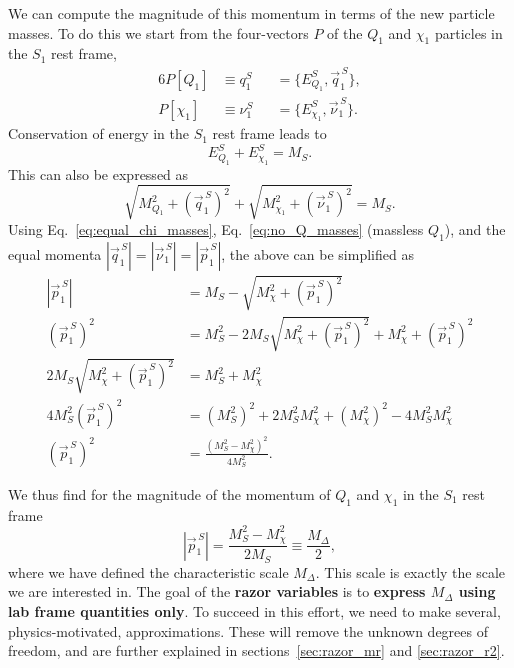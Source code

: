 We can compute the magnitude of this momentum in terms of the new particle masses. To do this we
start from the four-vectors $P$ of the $Q_1$ and $\chi_1$ particles in the $S_1$ rest frame, 
\begin{alignat}{6}
  P[Q_1]    &\equiv q_1^S   &&= \{ E^S_{Q_1}, \vec{q}^{\,S}_1\} , \\
  P[\chi_1] &\equiv \nu_1^S &&= \{ E^S_{\chi_1}, \vec{\nu}^{\,S}_1\} .
\end{alignat}
Conservation of energy in the $S_1$ rest frame leads to 
\begin{equation}
  E^S_{Q_1} + E^S_{\chi_1} = M_S . \label{eq:razor_conservation_energy}
\end{equation}
This can also be expressed as
\begin{equation}
  \sqrt{M_{Q_1}^2 + (\vec{q}^{\,S}_1)^2 } + \sqrt{M_{\chi_1}^2 + (\vec{\nu}^{\,S}_1)^2} = M_S .
\end{equation}
Using Eq.~\ref{eq:equal_chi_masses}, Eq.~\ref{eq:no_Q_masses} (massless $Q_1$), and the equal
momenta $|\vec{q}^{\,S}_1| = |\vec{\nu}^{\,S}_1| = |\vec{p}^{\,S}_1|$, the above can be simplified
as
\begin{align}
  |\vec{p}^{\,S}_1|   &= M_S - \sqrt{M_{\chi}^2 + (\vec{p}^{\,S}_1)^2} \\
  (\vec{p}^{\,S}_1)^2 &= M_S^2 - 2 M_S \sqrt{M_{\chi}^2 + (\vec{p}^{\,S}_1)^2} + M_{\chi}^2 +
(\vec{p}^{\,S}_1)^2 \\
  2 M_S \sqrt{M_{\chi}^2 + (\vec{p}^{\,S}_1)^2} &= M_S^2 + M_{\chi}^2 \\
  4 M_S^2 (\vec{p}^{\,S}_1)^2 &= (M_S^2)^2 + 2 M_S^2 M_{\chi}^2 + (M_{\chi}^2)^2 - 4 M_S^2
M_{\chi}^2 \\
  (\vec{p}^{\,S}_1)^2 &= \frac{(M_S^2 -M_{\chi}^2 )^2}{4 M_S^2} .
\end{align}

We thus find for the magnitude of the momentum of $Q_1$ and $\chi_1$ in the $S_1$ rest frame
\begin{equation}
  |\vec{p}^{\,S}_1| = \frac{M_S^2 -M_{\chi}^2}{2 M_S} \equiv \frac{M_\Delta}{2} ,
\label{eq:razor_p_S1_rest_frame}
\end{equation}
where we have defined the characteristic scale $M_\Delta$. This scale is exactly the scale we are
interested in. The goal of the \textbf{razor variables} is to \textbf{express $M_\Delta$ using lab
frame quantities only}. To succeed in this effort, we need to make several, physics-motivated,
approximations. These will remove the unknown degrees of freedom, and are further explained in
sections~\ref{sec:razor_mr} and \ref{sec:razor_r2}. 

